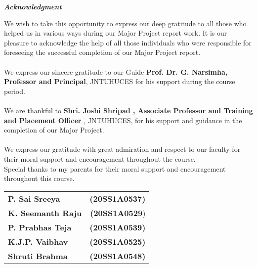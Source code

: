 \documentclass[12pt,a4paper]{report}
\begin{document}
\newpage
{}	
\begin{center}
{\LARGE \textbf{\textit{Acknowledgment}}}
\end{center}
\vspace{1cm}
{\large {We wish to take this opportunity to express our deep gratitude to all those who helped us in various ways during our Major Project report work. It is our pleasure to acknowledge the help of all those individuals who were responsible for foreseeing the successful completion of our Major Project report.\\ \\
\hspace*{35pt}We express our sincere gratitude to our Guide \textbf{\large Prof. Dr. G. Narsimha, Professor and Principal}, JNTUHUCES for his support during the course period.\\ \\
\hspace*{35pt}We are thankful to \textbf{ Shri. Joshi Shripad , Associate Professor and Training and Placement Officer} , JNTUHUCES, for his support and guidance in the completion of our Major Project.\\ \\
\hspace*{35pt}We express our gratitude with great admiration and respect to our faculty for their moral support and encouragement throughout the course.\\
Special thanks to my parents for their moral support and encouragement throughout this course.}}\\

\begin{table}[ht]
	\begin{flushright}
		\begin{tabular}{l r}
		{\large \textbf{P. Sai Sreeya}} & {\large \textbf{(20SS1A0537)}}\\
		{\large \textbf{K. Seemanth Raju}} & {\large \textbf{(20SS1A0529}})\\
        {\large \textbf{P. Prabhas Teja}} & {\large \textbf{(20SS1A0539)}}\\
		{\large \textbf{K.J.P. Vaibhav}} & {\large \textbf{(20SS1A0525)}}\\
        {\large \textbf{Shruti Brahma}} & {\large \textbf{(20SS1A0548)}}\\
		\end{tabular}
	\end{flushright}
\end{table}
\end{document}
